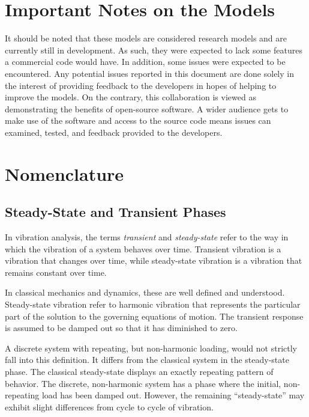 \section{Important Notes on the Models}
It should be noted that these models are considered research models and are currently still in development.  As such, they were expected to lack some features a commercial code would have.  In addition, some issues were expected to be encountered.  Any potential issues reported in this document are done solely in the interest of providing feedback to the developers in hopes of helping to improve the models.    On the contrary, this collaboration is viewed as demonstrating the benefits of open-source software.  A wider audience gets to make use of the software and access to the source code means issues can examined, tested, and feedback provided to the developers.


\section{Nomenclature}
\subsection{Steady-State and Transient Phases}
In vibration analysis, the terms \emph{transient} and \emph{steady-state} refer to the way in which the vibration of a system behaves over time.  Transient vibration is a vibration that changes over time, while steady-state vibration is a vibration that remains constant over time.

In classical mechanics and dynamics, these are well defined and understood.  Steady-state vibration refer to harmonic vibration that represents the particular part of the solution to the governing equations of motion.  The transient response is assumed to be damped out so that it has diminished to zero.

A discrete system with repeating, but non-harmonic loading, would not strictly fall into this definition.  It differs from the classical system in the steady-state phase.  The classical steady-state displays an exactly repeating pattern of behavior.  The discrete, non-harmonic system has a phase where the initial, non-repeating load has been damped out.  However, the remaining ``steady-state'' may exhibit slight differences from cycle to cycle of vibration.  

